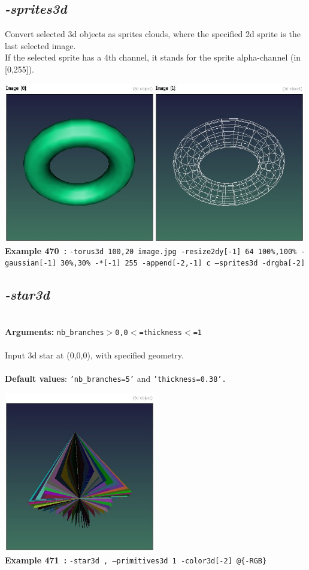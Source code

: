 \documentclass[a4paper,11pt,twoside]{book}
\begin{document}
\subsection{\emph{-sprites3d} }\vspace*{-0.5em}
Convert selected 3d objects as sprites clouds, where the specified 2d sprite is the last selected image.
~\\If the selected sprite has a 4th channel, it stands for the sprite alpha-channel (in [0,255]).
\begin{center}\includegraphics[keepaspectratio=true,height=7cm,width=\textwidth]{img/gmic_def470.jpg}\\
{\footnotesize \textbf{Example 470~:} \texttt{-torus3d 100,20 image.jpg -resize2dy[-1] 64 100\%,100\% -gaussian[-1] 30\%,30\% -*[-1] 255 -append[-2,-1] c --sprites3d -drgba[-2]}}
\end{center}

\subsection{\emph{-star3d} }\vspace*{-0.5em}
~\\\textbf{Arguments: } 
{\small \texttt{nb\_branches$>$0,0$<$=thickness$<$=1}}\\~\\
Input 3d star at (0,0,0), with specified geometry.
~\\~\\\textbf{Default values}: {\small \texttt{'nb\_branches=5'} and \texttt{'thickness=0.38'.}}
\begin{center}\includegraphics[keepaspectratio=true,height=7cm,width=\textwidth]{img/gmic_def471.jpg}\\
{\footnotesize \textbf{Example 471~:} \texttt{-star3d , --primitives3d 1 -color3d[-2] @\{-RGB\}}}
\end{center}
\end{document}

